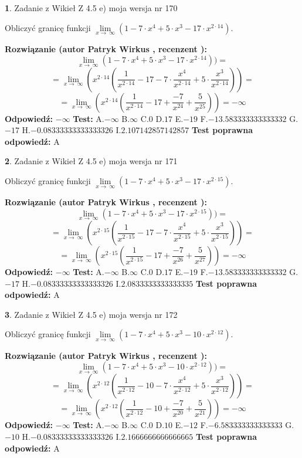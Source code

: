 \documentclass[12pt, a4paper]{article}
\theoremstyle{definition} %
\newtheorem{zad}{}
\newcommand{\zadStart}[1]{\begin{zad}#1\newline}
\newcommand{\zadStop}{\end{zad}}
\newcommand{\rozwStart}[2]{\noindent \textbf{Rozwiązanie (autor #1 , recenzent #2): }\newline}
\newcommand{\rozwStop}{\newline}
\newcommand{\odpStart}{\noindent \textbf{Odpowiedź:}\newline}
\newcommand{\odpStop}{\newline}
\newcommand{\testStart}{\noindent \textbf{Test:}\newline}
\newcommand{\testStop}{\newline}
\newcommand{\kluczStart}{\noindent \textbf{Test poprawna odpowiedź:}\newline}
\newcommand{\kluczStop}{\newline}
\begin{document}
\zadStart{Zadanie z Wikieł Z 4.5 e) moja wersja nr 170}


Obliczyć granicę funkcji  $\lim\limits_{x\to\ \infty}(1 - 7 \cdot x^{4}+5 \cdot x^{3}- 17 \cdot x^{2\cdot14})$.
\zadStop
\rozwStart{Patryk Wirkus}{}
$$\lim\limits_{x\to\ \infty}(1 - 7 \cdot x^{4}+5 \cdot x^{3}- 17 \cdot x^{2\cdot14}))=$$
$$=\lim\limits_{x\to\ \infty}(x^{2\cdot14}(\frac{1}{x^{2\cdot14}}-17 -7 \cdot \frac{x^{4}}{x^{2\cdot14}}+5 \cdot \frac{x^{3}}{x^{2\cdot14}}))=$$
$$=\lim\limits_{x\to\ \infty}(x^{2\cdot14}(\frac{1}{x^{2\cdot14}}-17 + \frac{-7}{x^{24}}+ \frac{5}{x^{25}}))=-\infty$$
\rozwStop
\odpStart
$-\infty$
\odpStop
\testStart
A.$-\infty$ B.$\infty$ C.$0$ D.$17$ E.$-19$
F.$-13.583333333333332$ G.$-17$
H.$-0.08333333333333326$
I.$2.107142857142857$
\testStop
\kluczStart
A
\kluczStop



\zadStart{Zadanie z Wikieł Z 4.5 e) moja wersja nr 171}


Obliczyć granicę funkcji  $\lim\limits_{x\to\ \infty}(1 - 7 \cdot x^{4}+5 \cdot x^{3}- 17 \cdot x^{2\cdot15})$.
\zadStop
\rozwStart{Patryk Wirkus}{}
$$\lim\limits_{x\to\ \infty}(1 - 7 \cdot x^{4}+5 \cdot x^{3}- 17 \cdot x^{2\cdot15}))=$$
$$=\lim\limits_{x\to\ \infty}(x^{2\cdot15}(\frac{1}{x^{2\cdot15}}-17 -7 \cdot \frac{x^{4}}{x^{2\cdot15}}+5 \cdot \frac{x^{3}}{x^{2\cdot15}}))=$$
$$=\lim\limits_{x\to\ \infty}(x^{2\cdot15}(\frac{1}{x^{2\cdot15}}-17 + \frac{-7}{x^{26}}+ \frac{5}{x^{27}}))=-\infty$$
\rozwStop
\odpStart
$-\infty$
\odpStop
\testStart
A.$-\infty$ B.$\infty$ C.$0$ D.$17$ E.$-19$
F.$-13.583333333333332$ G.$-17$
H.$-0.08333333333333326$
I.$2.0833333333333335$
\testStop
\kluczStart
A
\kluczStop



\zadStart{Zadanie z Wikieł Z 4.5 e) moja wersja nr 172}


Obliczyć granicę funkcji  $\lim\limits_{x\to\ \infty}(1 - 7 \cdot x^{4}+5 \cdot x^{3}- 10 \cdot x^{2\cdot12})$.
\zadStop
\rozwStart{Patryk Wirkus}{}
$$\lim\limits_{x\to\ \infty}(1 - 7 \cdot x^{4}+5 \cdot x^{3}- 10 \cdot x^{2\cdot12}))=$$
$$=\lim\limits_{x\to\ \infty}(x^{2\cdot12}(\frac{1}{x^{2\cdot12}}-10 -7 \cdot \frac{x^{4}}{x^{2\cdot12}}+5 \cdot \frac{x^{3}}{x^{2\cdot12}}))=$$
$$=\lim\limits_{x\to\ \infty}(x^{2\cdot12}(\frac{1}{x^{2\cdot12}}-10 + \frac{-7}{x^{20}}+ \frac{5}{x^{21}}))=-\infty$$
\rozwStop
\odpStart
$-\infty$
\odpStop
\testStart
A.$-\infty$ B.$\infty$ C.$0$ D.$10$ E.$-12$
F.$-6.583333333333333$ G.$-10$
H.$-0.08333333333333326$
I.$2.1666666666666665$
\testStop
\kluczStart
A
\kluczStop
\end{document}
